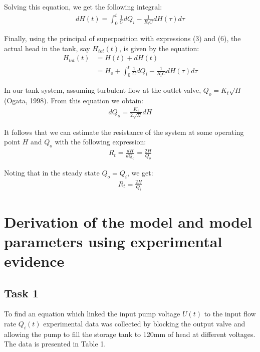 \documentclass{article}
\begin{document}
Solving this equation, we get the following integral:
\begin{align}
dH(t) = \int_{0}^{t}\frac{1}{C}dQ_i - \frac{1}{R_{t}C}dH(\tau) d\tau
\end{align}

Finally, using the principal of superposition with expressions (3) and (6), the actual head in the tank, say $H_{tot}(t)$, is given by the equation:
\begin{align}
H_{tot}(t) 	&= H(t) + dH(t) \nonumber \\
&= H_o + \int_{0}^{t}\frac{1}{C}dQ_i - \frac{1}{R_{t}C}dH(\tau) d\tau
\end{align}

In our tank system, assuming turbulent flow at the outlet valve, $Q_o = K_t\sqrt{H}$ (Ogata, 1998). From this equation we obtain:
\begin{align}
	dQ_o = \frac{K_t}{2\sqrt{H}}dH \nonumber
\end{align}

It follows that we can estimate the resistance of the system at some operating point $H$ and $Q_o$ with the following expression:
\begin{align}
	R_t = \frac{dH}{dQ_o} = \frac{2H}{Q_o} \nonumber
\end{align}

Noting that in the steady state $Q_o = Q_i$, we get:
\begin{align}
	R_t = \frac{2H}{Q_i}
\end{align}

\newpage


\section{Derivation of the model and model parameters using experimental evidence}

\subsection{Task 1}
 
 To find an equation which linked the input pump voltage $U(t)$ to the input flow rate $Q_{i}(t)$ experimental data was collected by blocking the output valve and allowing the pump to fill the storage tank to 120mm of head at different voltages. The data is presented in Table 1.
 
\end{document}
